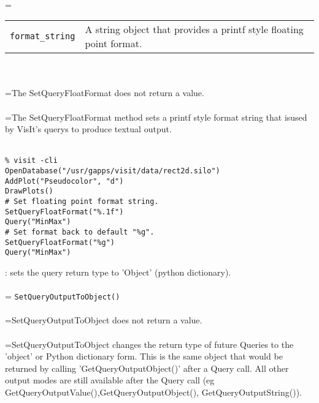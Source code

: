 \documentclass[10pt,a4paper]{report}
\begin{document}
 \\ 
\hangindent=\parindent 
\begin{tabular}{lp{9cm}}
\verb!format_string! & A string object that provides a printf style floating point format. \\
\end{tabular} \\[-2mm]


 \\ 
\hangindent=\parindent The SetQueryFloatFormat does not return a value. \\[-3mm] 

 \\ 
\hangindent=\parindent The SetQueryFloatFormat method sets a printf style format string that isused by VisIt's querys to produce textual output. \\[-3mm] 

\\[-6mm]
\begin{verbatim}% visit -cli
OpenDatabase("/usr/gapps/visit/data/rect2d.silo")
AddPlot("Pseudocolor", "d")
DrawPlots()
# Set floating point format string.
SetQueryFloatFormat("%.1f")
Query("MinMax")
# Set format back to default "%g".
SetQueryFloatFormat("%g")
Query("MinMax")
\end{verbatim}
\newpage


{}
: sets the query return type to 'Object' (python dictionary).\\[-3mm]

 \\ 
\hangindent=\parindent 
\verb!SetQueryOutputToObject()!\\ [-3mm]

 \\ 
\hangindent=\parindent SetQueryOutputToObject does not return a value. \\[-3mm] 

 \\ 
\hangindent=\parindent SetQueryOutputToObject changes the return type of future Queries to the 'object' or Python dictionary form. This is the same object that would be returned by calling 'GetQueryOutputObject()' after a Query call. All other output modes are still available after the Query call  (eg GetQueryOutputValue(),GetQueryOutputObject(), GetQueryOutputString()). \\[-3mm] 
\end{document}
